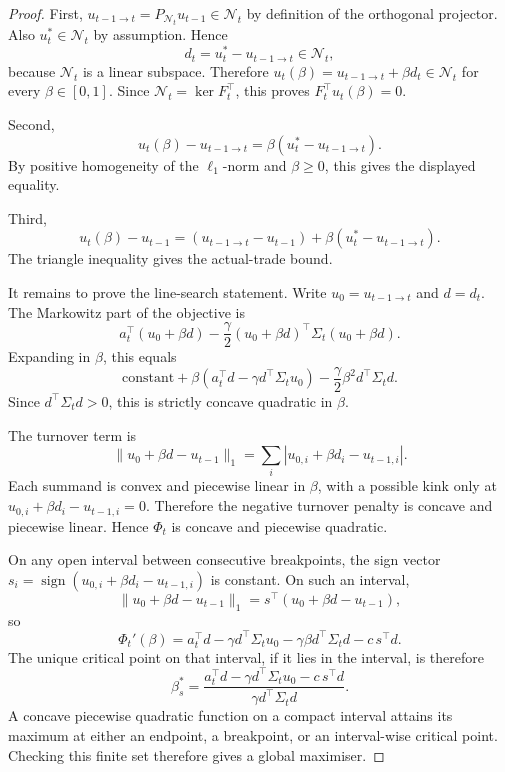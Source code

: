 \documentclass[11pt]{article}
\newcommand{\N}{\mathcal{N}}
\begin{document}
\begin{proof}
First, $u_{t-1\to t}=P_{\N_t}u_{t-1}\in\N_t$ by definition of the orthogonal projector.  Also
$u_t^\ast\in\N_t$ by assumption.  Hence
\[
        d_t=u_t^\ast-u_{t-1\to t}\in\N_t,
\]
because $\N_t$ is a linear subspace.  Therefore $u_t(\beta)=u_{t-1\to t}+\beta d_t\in\N_t$ for
every $\beta\in[0,1]$.  Since $\N_t=\ker F_t^\top$, this proves $F_t^\top u_t(\beta)=0$.

Second,
\[
        u_t(\beta)-u_{t-1\to t}=\beta(u_t^\ast-u_{t-1\to t}).
\]
By positive homogeneity of the $\ell_1$-norm and $\beta\ge0$, this gives the displayed equality.

Third,
\[
        u_t(\beta)-u_{t-1}
        =(u_{t-1\to t}-u_{t-1})+\beta(u_t^\ast-u_{t-1\to t}).
\]
The triangle inequality gives the actual-trade bound.

It remains to prove the line-search statement.  Write $u_0=u_{t-1\to t}$ and $d=d_t$.  The Markowitz
part of the objective is
\[
        a_t^\top(u_0+\beta d)
        -
        \frac{\gamma}{2}(u_0+\beta d)^\top\Sigma_t(u_0+\beta d).
\]
Expanding in $\beta$, this equals
\[
        \text{constant}+\beta\left(a_t^\top d-\gamma d^\top\Sigma_tu_0\right)
        -\frac{\gamma}{2}\beta^2d^\top\Sigma_t d.
\]
Since $d^\top\Sigma_t d>0$, this is strictly concave quadratic in $\beta$.

The turnover term is
\[
        \|u_0+\beta d-u_{t-1}\|_1=\sum_i |u_{0,i}+\beta d_i-u_{t-1,i}|.
\]
Each summand is convex and piecewise linear in $\beta$, with a possible kink only at
$u_{0,i}+\beta d_i-u_{t-1,i}=0$.  Therefore the negative turnover penalty is concave and piecewise
linear.  Hence $\Phi_t$ is concave and piecewise quadratic.

On any open interval between consecutive breakpoints, the sign vector
$s_i=\operatorname{sign}(u_{0,i}+\beta d_i-u_{t-1,i})$ is constant.  On such an interval,
\[
        \|u_0+\beta d-u_{t-1}\|_1=s^\top(u_0+\beta d-u_{t-1}),
\]
so
\[
        \Phi_t'(\beta)
        =a_t^\top d-\gamma d^\top\Sigma_tu_0-\gamma\beta d^\top\Sigma_t d-c\,s^\top d.
\]
The unique critical point on that interval, if it lies in the interval, is therefore
\[
        \beta_s^\ast
        =
        \frac{
        a_t^\top d-\gamma d^\top\Sigma_tu_0-c\,s^\top d
        }{
        \gamma d^\top\Sigma_t d
        }.
\]
A concave piecewise quadratic function on a compact interval attains its maximum at either an endpoint,
a breakpoint, or an interval-wise critical point.  Checking this finite set therefore gives a global
maximiser.
\end{proof}
\end{document}
